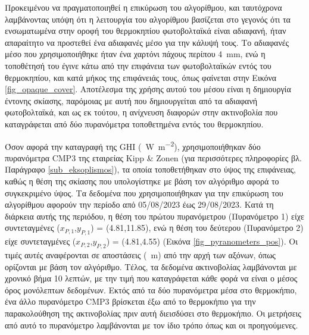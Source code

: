 \documentclass[12pt, a4paper]{report} %
\newcommand{\english}{\foreignlanguage{english}}
\begin{document}
Προκειμένου να πραγματοποιηθεί η επικύρωση του αλγορίθμου, και ταυτόχρονα λαμβάνοντας υπόψη ότι η λειτουργία του αλγορίθμου 
βασίζεται στο γεγονός ότι τα ενσωματωμένα στην οροφή του θερμοκηπίου φωτοβολταϊκά είναι αδιαφανή, ήταν απαραίτητο να προστεθεί 
ένα αδιαφανές μέσο για την κάλυψή τους. Το αδιαφανές μέσο που χρησιμοποιήθηκε ήταν ένα χαρτόνι πάχους περίπου \SI{4}{\milli\meter}, 
ενώ η τοποθέτησή του έγινε κάτω από την επιφάνεια των φωτοβολταϊκών εντός του θερμοκηπίου, και κατά μήκος της επιφάνειάς τους, όπως 
φαίνεται στην Εικόνα \ref{fig_opaque_cover}. Αποτέλεσμα της χρήσης αυτού του μέσου είναι η δημιουργία έντονης σκίασης, παρόμοιας 
με αυτή που δημιουργείται από τα αδιαφανή φωτοβολταϊκά, και ως εκ τούτου, η ανίχνευση διαφορών στην ακτινοβολία που καταγράφεται 
από δύο πυρανόμετρα τοποθετημένα εντός του θερμοκηπίου.

Όσον αφορά την καταγραφή της \english{GHI} (\SI{}{\watt\per\meter\squared}), χρησιμοποιήθηκαν δύο πυρανόμετρα \english{CMP3} 
της εταιρείας \english{Kipp \& Zonen} (για περισσότερες πληροφορίες βλ. Παράγραφο \ref{sub_eksoplismos}), τα οποία τοποθετήθηκαν 
στο ύψος της επιφάνειας, καθώς η θέση της σκίασης που υπολογίστηκε με βάση τον αλγόριθμο αφορά το συγκεκριμένο ύψος. Τα 
δεδομένα που χρησιμοποιήθηκαν για την επικύρωση του αλγορίθμου αφορούν την περίοδο από 05/08/2023 έως 29/08/2023. Κατά τη 
διάρκεια αυτής της περιόδου, η θέση του πρώτου πυρανόμετρου (Πυρανόμετρο 1) είχε συντεταγμένες 
(\english{$x_{P,1}$,$y_{P,1}$}) = (4.81,11.85), ενώ η θέση του δεύτερου (Πυρανόμετρο 2) είχε συντεταγμένες 
(\english{$x_{P,2}$,$y_{P,2}$}) = (4.81,4.55) (Εικόνα \ref{fig_pyranometers_pos}). Οι τιμές αυτές αναφέρονται σε 
αποστάσεις (\SI{}{\meter}) από την αρχή των αξόνων, όπως ορίζονται με βάση τον αλγόριθμο. Τέλος, τα δεδομένα ακτινοβολίας 
λαμβάνονται με χρονικό βήμα 10 λεπτών, με την τιμή που καταγράφεται κάθε φορά να είναι ο μέσος όρος μονόλεπτων δεδομένων. 
Εκτός από τα δύο πυρανόμετρα μέσα στο θερμοκήπιο, ένα άλλο πυρανόμετρο \english{CMP3} βρίσκεται έξω από το θερμοκήπιο για την 
παρακολούθηση της ακτινοβολίας πριν αυτή διεισδύσει στο θερμοκήπιο. Οι μετρήσεις από αυτό το πυρανόμετρο λαμβάνονται με τον ίδιο 
τρόπο όπως και οι προηγούμενες.
\end{document}
